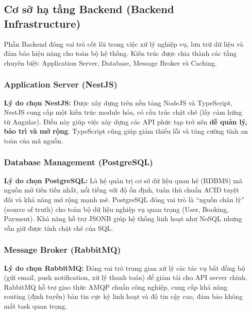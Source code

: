 

\subsection{Cơ sở hạ tầng Backend (Backend Infrastructure)}

Phần Backend đóng vai trò cốt lõi trong việc xử lý nghiệp vụ, lưu trữ dữ liệu và đảm bảo hiệu năng cho toàn bộ hệ thống. Kiến trúc được chia thành các tầng chuyên biệt: Application Server, Database, Message Broker và Caching.



\subsubsection{Application Server (NestJS)}
\noindent\textbf{Lý do chọn NestJS:} Được xây dựng trên nền tảng NodeJS và TypeScript, NestJS cung cấp một kiến trúc module hóa, có cấu trúc chặt chẽ (lấy cảm hứng từ Angular). Điều này giúp việc xây dựng các API phức tạp trở nên \textbf{dễ quản lý, bảo trì và mở rộng}. TypeScript cũng giúp giảm thiểu lỗi và tăng cường tính an toàn của mã nguồn.

\subsubsection{Database Management (PostgreSQL)}
\noindent\textbf{Lý do chọn PostgreSQL:} Là hệ quản trị cơ sở dữ liệu quan hệ (RDBMS) mã nguồn mở tiên tiến nhất, nổi tiếng với độ ổn định, tuân thủ chuẩn ACID tuyệt đối và khả năng mở rộng mạnh mẽ. PostgreSQL đóng vai trò là ``nguồn chân lý'' (source of truth) cho toàn bộ dữ liệu nghiệp vụ quan trọng (User, Booking, Payment). Khả năng hỗ trợ JSONB giúp hệ thống linh hoạt như NoSQL nhưng vẫn giữ được tính chặt chẽ của SQL.

\subsubsection{Message Broker (RabbitMQ)}
\noindent\textbf{Lý do chọn RabbitMQ:} Đóng vai trò trung gian xử lý các tác vụ bất đồng bộ (gửi email, push notification, xử lý thanh toán) để giảm tải cho API server chính. RabbitMQ hỗ trợ giao thức AMQP chuẩn công nghiệp, cung cấp khả năng routing (định tuyến) bản tin cực kỳ linh hoạt và độ tin cậy cao, đảm bảo không mất task quan trọng.

